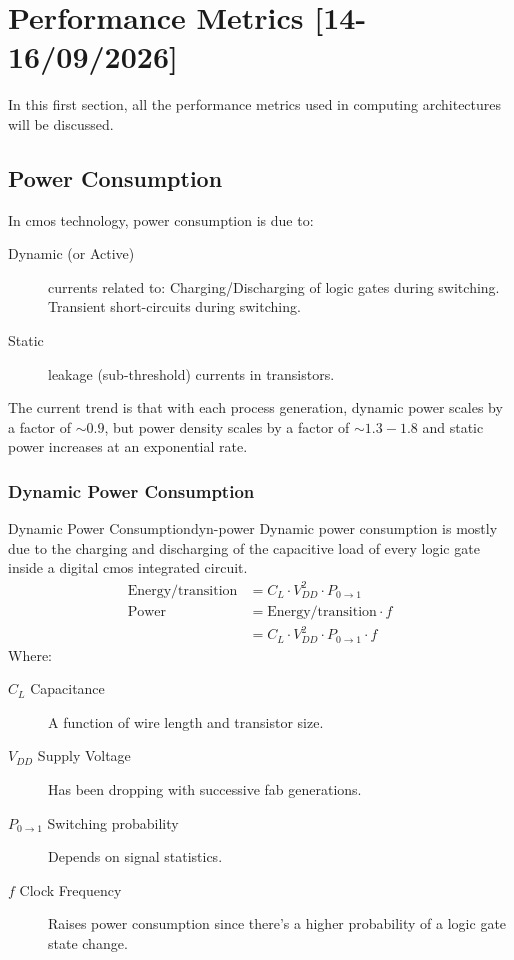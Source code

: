 \section{Performance Metrics [14-16/09/2026]} 
In this first section, all the performance metrics used in computing architectures will be discussed.

\subsection{Power Consumption}
In \gls{cmos} technology, power consumption is due to:
\begin{description}
    \item[Dynamic (or Active)] currents related to:
    \subitem Charging/Discharging of logic gates during switching.
    \subitem Transient short-circuits during switching.
    \item[Static] leakage (sub-threshold) currents in transistors.
\end{description}
The current trend is that with each process generation, dynamic power scales by a factor of \(\sim 0.9\), but power density scales by a factor of \(\sim 1.3-1.8\) and static power increases at an exponential rate.

\subsubsection{Dynamic Power Consumption}
\begin{definition}{Dynamic Power Consumption}{dyn-power}
    Dynamic power consumption is mostly due to the charging and discharging of the capacitive load of every logic gate inside a digital \gls{cmos} integrated circuit.
    \begin{align*}
        \text{Energy/transition} &= C_L \cdot V_{DD}^2 \cdot P_{0\rightarrow1} \\
        \text{Power} &= \text{Energy/transition} \cdot f \\
                     &= C_{L} \cdot V_{DD}^2 \cdot P_{0\rightarrow1} \cdot f
    \end{align*} 
    Where:
    \begin{description}
        \item[\(C_L\) Capacitance] A function of wire length and transistor size.
        \item[\(V_{DD}\) Supply Voltage] Has been dropping with successive fab generations.
        \item[\(P_{0\rightarrow1}\) Switching probability] Depends on signal statistics.
        \item[\(f\) Clock Frequency] Raises power consumption since there's a higher probability of a logic gate state change.
    \end{description}
\end{definition}

